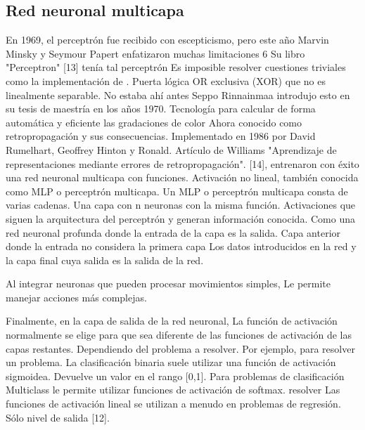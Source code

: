 \subsection{Red neuronal multicapa}\label{sec:Red neuronal multicapa} 

En 1969, el perceptrón fue recibido con escepticismo, pero este año 
Marvin Minsky y Seymour Papert enfatizaron muchas limitaciones  
6 
Su libro "Perceptron" [13] tenía tal perceptrón 
Es imposible resolver cuestiones triviales como la implementación de . 
Puerta lógica OR exclusiva (XOR) que no es linealmente separable. No estaba ahí antes
Seppo Rinnainmaa introdujo esto en su tesis de maestría en los años 1970. 
Tecnología para calcular de forma automática y eficiente las gradaciones de color 
Ahora conocido como retropropagación y sus consecuencias. 
Implementado en 1986 por  David Rumelhart, Geoffrey Hinton y Ronald. 
Artículo de Williams "Aprendizaje de representaciones mediante errores de retropropagación". 
[14], entrenaron con éxito una red neuronal multicapa con funciones. 
Activación no lineal, también conocida como MLP o perceptrón multicapa. 
Un MLP o perceptrón multicapa consta de varias cadenas. 
Una capa con n  neuronas con la misma función. 
Activaciones que siguen la arquitectura del perceptrón y generan información conocida. 
Como una red neuronal profunda donde la entrada de la capa es la salida. 
 Capa anterior donde la entrada no considera la primera capa  
Los datos introducidos en la red y la  capa final cuya salida es la salida de la red.

Al integrar neuronas que pueden procesar movimientos simples, 
 Le permite manejar acciones más complejas.

Finalmente, en la capa de salida de la red neuronal, 
 La función de activación normalmente se elige para que sea diferente de las funciones de activación de las capas restantes. 
Dependiendo del problema a resolver. Por ejemplo, para resolver un problema. 
La clasificación binaria suele utilizar una función de activación sigmoidea. 
Devuelve un valor en el rango [0,1]. Para problemas de clasificación 
Multiclass le permite utilizar funciones de activación de softmax. resolver 
Las funciones de activación lineal se utilizan a menudo en problemas de regresión. 
Sólo nivel de salida [12]. 





\newpage
\thispagestyle{empty} %
\mbox{} %


